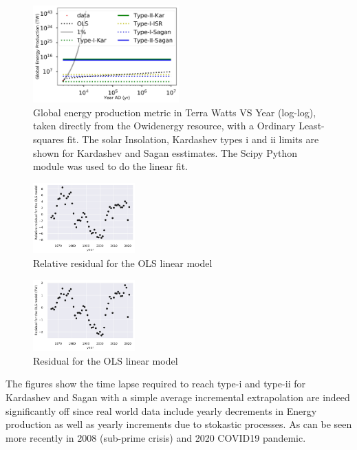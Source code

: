 \documentclass[final,5p,times,twocolumn,authoryear]{elsarticle}
\begin{document}
\begin{figure}
    \centering
    \includegraphics[width=0.5\textwidth]{figs/fig2_kar.jpg}
    \caption{Global energy production metric in Terra Watts VS Year (log-log), taken directly from the Owidenergy resource, with a Ordinary Least-squares fit. The solar Insolation, Kardashev types i and ii limits are shown for Kardashev and Sagan esstimates. The Scipy Python module was used to do the linear fit.}
    \label{fig:kardashev3}

\end{figure}

\begin{figure}
    \centering
    \includegraphics[width=0.35\textwidth]{figs/fig1p_kar_rel_res.jpg}
    \caption{Relative residual for the OLS
    linear model}
    \label{fig:kardashev1_rel_res}

\end{figure}

\begin{figure}
    \centering
    \includegraphics[width=0.35\textwidth]{figs/fig1p_kar_res.jpg}
    \caption{Residual for the OLS
    linear model}
    \label{fig:kardashev1_res}

\end{figure}

The figures show the time lapse required to reach type-i and type-ii for Kardashev and Sagan with a simple average incremental extrapolation are indeed significantly off since real world data include yearly decrements in Energy production as well as yearly increments due to stokastic processes. As can be seen more recently in 2008 (sub-prime crisis) and 2020 COVID19 pandemic.
\end{document}
